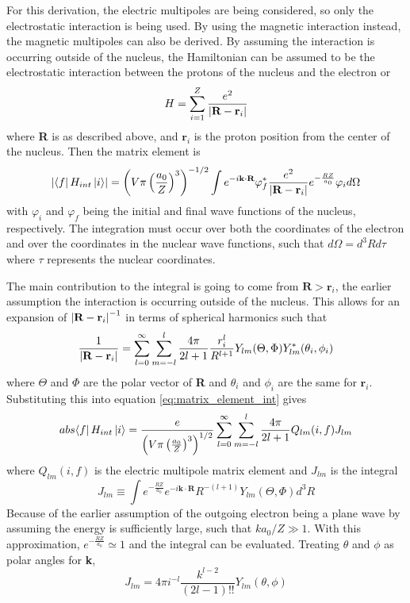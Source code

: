For this derivation, the electric multipoles are being considered, so only the electrostatic interaction is being used. By using the magnetic interaction instead, the magnetic multipoles can also be derived. By assuming the interaction is occurring outside of the nucleus, the Hamiltonian can be assumed to be the electrostatic interaction between the protons of the nucleus and the electron or
\begin{equation}
    H=\sum_{i=1}^Z \frac{e^2}{\abs{\textbf{R}-\textbf{r}_i}}
\end{equation}
where \textbf{R} is as described above, and $\textbf{r}_i$ is the proton position from the center of the nucleus. Then the matrix element is
\begin{equation}
\label{eq:matrix_element_int}
    \abs{\bra{f}H_{int}\ket{i}} = \left(V\pi\left(\frac{a_0}{Z}\right)^3\right)^{-1/2}\int e^{-i\textbf{k}\cdot\textbf{R}}\varphi_{f}^* \frac{e^2}{\abs{\textbf{R}-\textbf{r}_i}} e^{-\frac{RZ}{a_0}}\varphi_{i}d\Omega
\end{equation}
with $\varphi_{i}$ and $\varphi_{f}$ being the initial and final wave functions of the nucleus, respectively. The integration must occur over both the coordinates of the electron and over the coordinates in the nuclear wave functions, such that $d\Omega=d^3Rd\tau$ where $\tau$ represents the nuclear coordinates.

The main contribution to the integral is going to come from $\textbf{R}>\textbf{r}_i$, the earlier assumption the interaction is occurring outside of the nucleus. This allows for an expansion of $\abs{\textbf{R}-\textbf{r}_i}^{-1}$ in terms of spherical harmonics such that
\begin{equation}
\label{eq:expansion_Rri}
    \frac{1}{\abs{\textbf{R}-\textbf{r}_i}} = \sum_{l=0}^\infty\sum_{m=-l}^{l}\frac{4\pi}{2l+1}\frac{r_i^l}{R^{l+1}}Y_{lm}(\Theta,\Phi)Y_{lm}^{*}(\theta_i,\phi_i)
\end{equation}
where $\Theta$ and $\Phi$ are the polar vector of \textbf{R} and $\theta_i$ and $\phi_i$ are the same for $\textbf{r}_i$. Substituting this into equation \ref{eq:matrix_element_int} gives
\begin{equation}
    
    abs{\bra{f}H_{int}\ket{i}} = \frac{e}{ \left(V\pi\left(\frac{a_0}{Z}\right)^3\right)^{1/2}} \sum_{l=0}^\infty\sum_{m=-l}^{l}\frac{4\pi}{2l+1} Q_{lm}(i,f)J_{lm}
\end{equation}
where $Q_{lm}(i,f)$ is the electric multipole matrix element and $J_{lm}$ is the integral
\begin{equation}
    J_{lm}\equiv\int e^{-\frac{RZ}{a_0}}e^{-i\textbf{k}\cdot\textbf{R}}R^{-(l+1)}Y_{lm}(\Theta,\Phi)d^3R
\end{equation}
Because of the earlier assumption of the outgoing electron being a plane wave by assuming the energy is sufficiently large, such that $ka_0/Z\gg1$. With this approximation, $e^{-\frac{RZ}{a_0}}\simeq1$ and the integral can be evaluated. Treating $\theta$ and $\phi$ as polar angles for \textbf{k}, 
\begin{equation}
    J_{lm}=4\pi i^{-l}\frac{k^{l-2}}{(2l-1)!!}Y_{lm}(\theta,\phi)
\end{equation}

